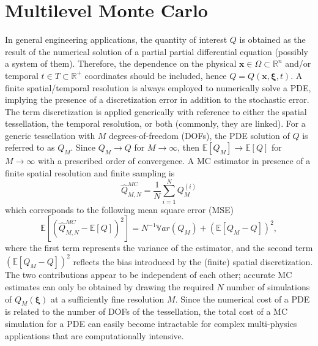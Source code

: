 \section{Multilevel Monte Carlo} \label{uq:sampling:multilevel}
In general engineering applications, the quantity of interest $Q$
is obtained as the result of the numerical solution of a partial partial differential equation (possibly a system of them).  Therefore, the dependence on the 
physical $\mathbf{x} \in \Omega\subset\mathbb{R}^n$ and/or temporal $t \in T\subset\mathbb{R^+}$ coordinates should be included, 
hence $Q=Q(\mathbf{x}, \boldsymbol{\xi}, t)$. A finite spatial/temporal resolution is always employed to numerically solve a PDE, implying
the presence of a discretization error in addition to the stochastic error. The term discretization is applied generically with reference 
to either the spatial tessellation, the temporal resolution, or both (commonly, they are linked). For a generic tessellation with $M$ 
degrees-of-freedom (DOFs), the PDE solution of $Q$ is referred to as $Q_M$. Since $Q_M \rightarrow Q$ for $M\rightarrow\infty$, 
then $\mathbb{E}\left[{Q_M}\right] \rightarrow \mathbb{E}\left[{Q}\right]$ for $M\rightarrow\infty$ with a prescribed order of convergence. 
A MC estimator in presence of a finite spatial resolution and finite sampling is
\begin{equation}
\hat{Q}^{MC}_{M,N} = \frac{1}{N} \sum_{i=1}^N Q_M^{(i)}
\end{equation}
which corresponds to the following mean square error (MSE)
\begin{equation}
\mathbb{E}\left[ (\hat{Q}^{MC}_{M,N}-\mathbb{E}\left[ Q \right] )^2 \right]
       = N^{-1} \mathbb{V}ar\left({Q_M}\right) + \left( \mathbb{E}\left[{ Q_M-Q }\right] \right)^2,
\end{equation}
where the first term represents the variance of the estimator, and the second term $\left( \mathbb{E}\left[ Q_M-Q \right] \right)^2$ reflects the bias
introduced by the (finite) spatial discretization. The two contributions appear to be independent of each other; accurate MC estimates can only be obtained by drawing the required $N$ number of simulations of $Q_M( \boldsymbol{\xi} )$ at 
a sufficiently fine resolution $M$. Since the numerical cost of a PDE is related to the number of DOFs of the tessellation,
the total cost of a MC simulation for a PDE can easily become intractable for complex multi-physics applications that are computationally 
intensive.

